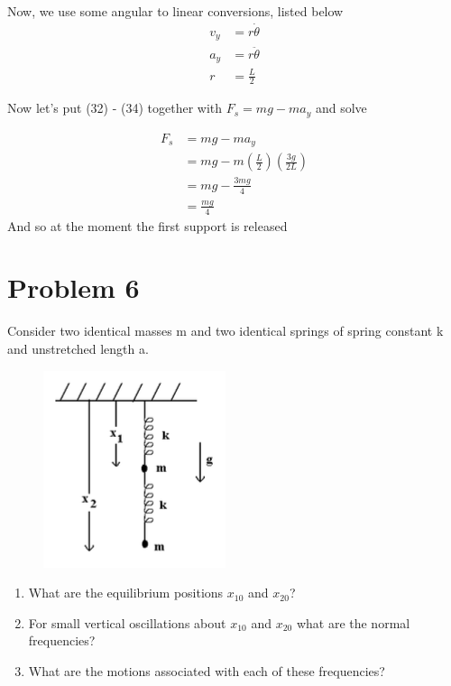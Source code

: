 \documentclass{article}
\begin{document}
Now, we use some angular to linear conversions, listed below
\begin{align}
	v_y &= r\dot{\theta} \\
	a_y &= r\ddot{\theta} \\
	r &= \frac{L}{2}
\end{align}

Now let's put (32) - (34) together with $ F_s = mg - ma_y $ and solve

\begin{align}
	F_s &= mg - ma_y \\ 
	&= mg - m\left( \frac{L}{2} \right) \left( \frac{3g}{2L} \right) \\
	&= mg - \frac{3mg}{4} \\ 
	&= \frac{mg}{4}
\end{align}
And so  at the moment the first support is released

\section*{Problem 6} 
Consider two identical masses m and two identical springs of spring constant k and unstretched length a.
\begin{figure}[h]
	\includegraphics[scale=0.5]{P6}
	\centering
\end{figure}
\begin{enumerate}[label=\alph*)]
	\item %
	What are the equilibrium positions $x_{10}$ and $x_{20}$?
	\item %
	For small vertical oscillations about  $x_{10}$ and $x_{20}$ what are the normal frequencies?
	\item %
	What are the motions associated with each of these frequencies?
\end{enumerate}
\end{document}
